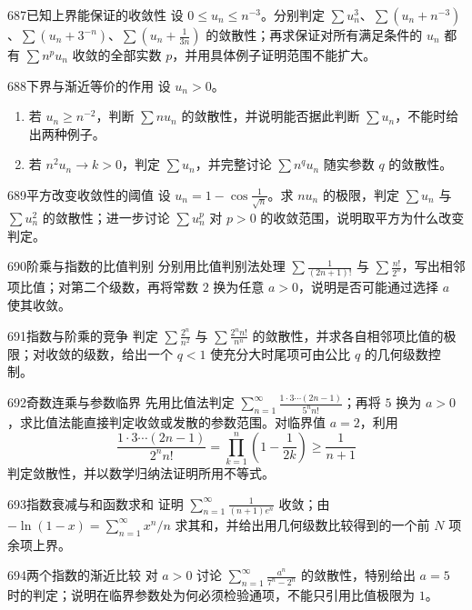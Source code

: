 \begin{exercise}{687}{已知上界能保证的收敛性}
设 $0\le u_n\le n^{-3}$。分别判定 $\sum u_n^3$、$\sum(u_n+n^{-3})$、$\sum(u_n+3^{-n})$、$\sum(u_n+\frac1{3n})$ 的敛散性；再求保证对所有满足条件的 $u_n$ 都有 $\sum n^p u_n$ 收敛的全部实数 $p$，并用具体例子证明范围不能扩大。
\end{exercise}
\begin{exercise}{688}{下界与渐近等价的作用}
设 $u_n>0$。
\begin{enumerate}
\item 若 $u_n\ge n^{-2}$，判断 $\sum nu_n$ 的敛散性，并说明能否据此判断 $\sum u_n$，不能时给出两种例子。
\item 若 $n^2u_n\to k>0$，判定 $\sum u_n$，并完整讨论 $\sum n^q u_n$ 随实参数 $q$ 的敛散性。
\end{enumerate}
\end{exercise}
\begin{exercise}{689}{平方改变收敛性的阈值}
设 $u_n=1-\cos\frac1{\sqrt n}$。求 $nu_n$ 的极限，判定 $\sum u_n$ 与 $\sum u_n^2$ 的敛散性；进一步讨论 $\sum u_n^p$ 对 $p>0$ 的收敛范围，说明取平方为什么改变判定。
\end{exercise}
\begin{exercise}{690}{阶乘与指数的比值判别}
分别用比值判别法处理 $\sum\frac1{(2n+1)!}$ 与 $\sum\frac{n!}{2^n}$，写出相邻项比值；对第二个级数，再将常数 $2$ 换为任意 $a>0$，说明是否可能通过选择 $a$ 使其收敛。
\end{exercise}
\begin{exercise}{691}{指数与阶乘的竞争}
判定 $\sum\frac{2^n}{n^2}$ 与 $\sum\frac{2^n n!}{n^n}$ 的敛散性，并求各自相邻项比值的极限；对收敛的级数，给出一个 $q<1$ 使充分大时尾项可由公比 $q$ 的几何级数控制。
\end{exercise}
\begin{exercise}{692}{奇数连乘与参数临界}
先用比值法判定 $\sum_{n=1}^{\infty}\frac{1\cdot3\cdots(2n-1)}{5^n n!}$；再将 $5$ 换为 $a>0$，求比值法能直接判定收敛或发散的参数范围。对临界值 $a=2$，利用
\[\frac{1\cdot3\cdots(2n-1)}{2^n n!}=\prod_{k=1}^{n}\left(1-\frac1{2k}\right)\ge\frac1{n+1}\]
判定敛散性，并以数学归纳法证明所用不等式。
\end{exercise}
\begin{exercise}{693}{指数衰减与和函数求和}
证明 $\sum_{n=1}^{\infty}\frac1{(n+1)e^n}$ 收敛；由 $-\ln(1-x)=\sum_{n=1}^{\infty}x^n/n$ 求其和，并给出用几何级数比较得到的一个前 $N$ 项余项上界。
\end{exercise}
\begin{exercise}{694}{两个指数的渐近比较}
对 $a>0$ 讨论 $\sum_{n=1}^{\infty}\frac{a^n}{7^n-2^n}$ 的敛散性，特别给出 $a=5$ 时的判定；说明在临界参数处为何必须检验通项，不能只引用比值极限为 $1$。
\end{exercise}
